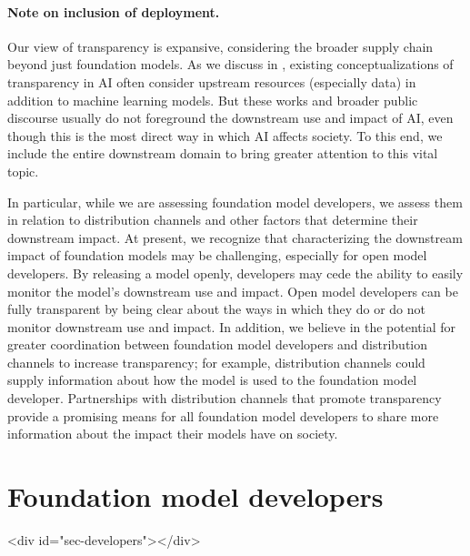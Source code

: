 \documentclass[screen, authorversion, acmsmall]{acmart}
\begin{document}
\paragraph{Note on inclusion of deployment.}
Our view of transparency is expansive, considering the broader supply chain beyond just foundation models.
As we discuss in , existing conceptualizations of transparency in AI often consider upstream resources (especially data) in addition to machine learning models.
But these works and broader public discourse usually do not foreground the downstream use and impact of AI, even though this is the most direct way in which AI affects society.
To this end, we include the entire downstream domain to bring greater attention to this vital topic.

In particular, while we are assessing foundation model developers, we assess them in relation to distribution channels and other factors that determine their downstream impact.
At present, we recognize that characterizing the downstream impact of foundation models may be challenging, especially for open model developers.
By releasing a model openly, developers may cede the ability to easily monitor the model's downstream use and impact.
Open model developers can be fully transparent by being clear about the ways in which they do or do not monitor downstream use and impact.
In addition, we believe in the potential for greater coordination between foundation model developers and distribution channels to increase transparency; for example, distribution channels could supply information about how the model is used to the foundation model developer.
Partnerships with distribution channels that promote transparency provide a promising means for all foundation model developers to share more information about the impact their models have on society.
\clearpage
\hypertarget{developers}{\section{Foundation model developers}}
<div id="sec-developers"></div>




\end{document}
